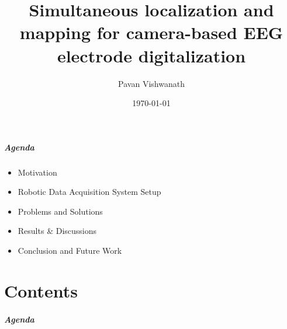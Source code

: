 \documentclass[10pt]{beamer}
\title[short title]{Simultaneous localization and mapping for camera-based EEG electrode digitalization
}
\author{Pavan Vishwanath}
\institute[MTEC]
{
Institute of Medical Technology, TUHH \\
\medskip
{\emph{pavan.vishwanath@tuhh.de}}
}
\date{\today}
\begin{document}
\frame{\titlepage}

\begin{frame}
  \frametitle{Agenda}
	\begin{itemize}
		\item Motivation
		\item Robotic Data Acquisition System Setup
		\item Problems and Solutions
		\item Results \& Discussions
		\item Conclusion and Future Work
	\end{itemize}
\end{frame}

\part{Contents}






















\begin{frame}
	\frametitle{Agenda}
	\printbibliography
\end{frame}
\end{document}
